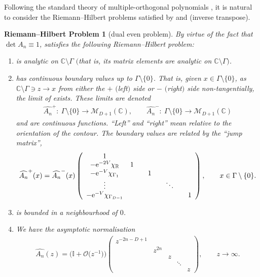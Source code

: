 \documentclass[pdftex]{sigma}
\numberwithin{equation}{section}
\newtheorem{rhp}[Theorem]{Riemann--Hilbert Problem}
\begin{document}
Following the standard theory of multiple-orthogonal polynomials \cite{VanAssche2001}, it is natural to consider the Riemann--Hilbert problems satisfied by  and  (inverse transpose).
\begin{rhp}[dual even problem]\label{dualeven} By virtue of the fact that $\det A_n \equiv 1$,  satisfies the following Riemann--Hilbert problem:
\begin{enumerate}\itemsep=0pt
\item[$(1)$]  is analytic on $\mathbb{C}\setminus \Gamma$ $($that is, its matrix elements are analytic on $\mathbb{C}\setminus \Gamma)$.
\item[$(2)$]  has continuous boundary values up to $\Gamma \setminus \{ 0 \}$. That is, given $x \in \Gamma \setminus \{ 0 \}$, as $\mathbb{C}\setminus \Gamma \ni z \to x$ from either the $+$ $($left$)$ side or $-$ $($right$)$ side non-tangentially, the limit of  exists. These limits are denoted
\begin{align*}
\widehat{A_{n}}^+ \colon\ \Gamma \setminus \{ 0 \} \longrightarrow \mathcal{M}_{D+1}(\mathbb{C}), \qquad
\widehat{A_{n}}^- \colon\ \Gamma \setminus \{ 0 \} \longrightarrow \mathcal{M}_{D+1}(\mathbb{C})
\end{align*}
and are continuous functions. \enquote{Left} and \enquote{right} mean relative to the orientation of the contour. The boundary values are related by the \enquote{jump matrix},
\begin{align*}
\widehat{A_{n}}^{+}(x) = \widehat{A_{n}}^{-}(x)\left(
\begin{array}{ccccccccccccccccccc}
1 & & & \\
- {\rm e}^{-2V} \chi_\mathbb{R} & 1 \\
- {\rm e}^{-V} \chi_{\Gamma_1} & & & 1 \\
\vdots & & & & & \ddots \\
- {\rm e}^{-V} \chi_{\Gamma_{D-1}} & & & & & & & 1 \\
\end{array} \right), \qquad x \in \Gamma \setminus \{ 0 \}.
\end{align*}
\item[$(3)$]  is bounded in a neighbourhood of $0$.
\item[$(4)$] We have the asymptotic normalisation
\begin{align*}
\widehat{A_{n}}(z) = \big(\mathbb{I}+ \mathcal{O}\big(z^{-1}\big)\big) \left(\begin{matrix}
z^{-2n-D+1} \\
& z^{2n} \\
& & z \\
& & & \ddots \\
& & & & z
\end{matrix} \right),\qquad z \to \infty.
\end{align*}
\end{enumerate}
\end{rhp}
\end{document}
